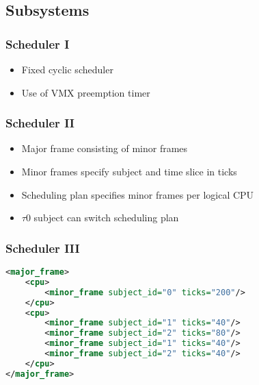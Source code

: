\documentclass[xcolor={dvipsnames}]{beamer}
\begin{document}
\subsection{Subsystems}
\begin{frame}\frametitle{Scheduler I}
\begin{itemize}
	\item Fixed cyclic scheduler
	\item Use of VMX preemption timer
\end{itemize}
\begin{center}
	
\end{center}
\end{frame}

\begin{frame}\frametitle{Scheduler II}
\begin{itemize}
	\item Major frame consisting of minor frames
	\item Minor frames specify subject and time slice in ticks
	\item Scheduling plan specifies minor frames per logical CPU
	\item $\tau$0 subject can switch scheduling plan
\end{itemize}

\begin{center}
	\noindent\resizebox{\textwidth}{!}{}
\end{center}
\end{frame}

\begin{frame}[fragile]\frametitle{Scheduler III}
\begin{lstlisting}[language=xml]
<major_frame>
    <cpu>
        <minor_frame subject_id="0" ticks="200"/>
    </cpu>
    <cpu>
        <minor_frame subject_id="1" ticks="40"/>
        <minor_frame subject_id="2" ticks="80"/>
        <minor_frame subject_id="1" ticks="40"/>
        <minor_frame subject_id="2" ticks="40"/>
    </cpu>
</major_frame>
\end{lstlisting}

\begin{center}
	\noindent\resizebox{\textwidth}{!}{}
\end{center}
\end{frame}
\end{document}
